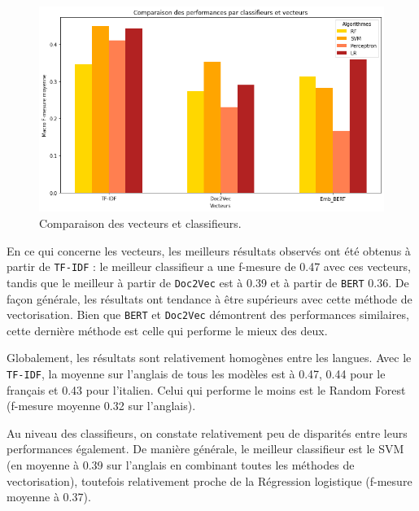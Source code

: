 \begin{figure}[t]
  \includegraphics[width=\columnwidth]{"./assets/comparaison_vecteur_clf_barplot.png"}
  \caption{Comparaison des vecteurs et classifieurs.}
  \label{fig:comparaison_vecteur}
\end{figure}

\par En ce qui concerne les vecteurs, les meilleurs résultats observés ont été obtenus à partir de \texttt{TF-IDF} : le meilleur classifieur a une f-mesure de 0.47 avec ces vecteurs, tandis que le meilleur à partir de \texttt{Doc2Vec} est à 0.39 et à partir de \texttt{BERT} 0.36. De façon générale, les résultats ont tendance à être supérieurs avec cette méthode de vectorisation. Bien que \texttt{BERT} et \texttt{Doc2Vec} démontrent des performances similaires, cette dernière méthode est celle qui performe le mieux des deux.
\par Globalement, les résultats sont relativement homogènes entre les langues. Avec le \texttt{TF-IDF}, la moyenne sur l'anglais de tous les modèles est à 0.47, 0.44 pour le français et 0.43 pour l'italien. Celui qui performe le moins est le Random Forest (f-mesure moyenne 0.32 sur l'anglais). 
\par Au niveau des classifieurs, on constate relativement peu de disparités entre leurs performances également. De manière générale, le meilleur classifieur est le SVM (en moyenne à 0.39 sur l'anglais en combinant toutes les méthodes de vectorisation), toutefois relativement proche de la Régression logistique (f-mesure moyenne à  0.37).